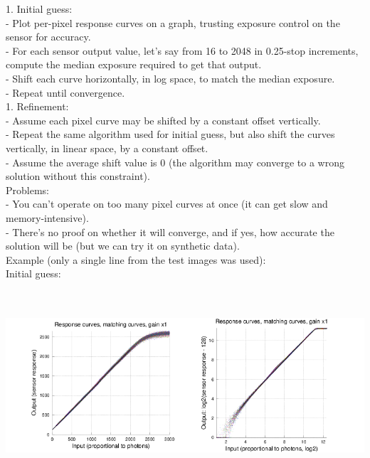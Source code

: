 1. Initial guess:\\

- Plot per-pixel response curves on a graph, trusting exposure control on the sensor for accuracy.\\
- For each sensor output value, let's say from 16 to 2048 in 0.25-stop increments, compute the median exposure required to get that output.\\
- Shift each curve horizontally, in log space, to match the median exposure.\\
- Repeat until convergence.\\
 
1. Refinement:\\

- Assume each pixel curve may be shifted by a constant offset vertically.\\
- Repeat the same algorithm used for initial guess, but also shift the curves vertically, in linear space, by a constant offset.\\
- Assume the average shift value is 0 (the algorithm may converge to a wrong solution without this constraint).\\

Problems:\\

- You can't operate on too many pixel curves at once (it can get slow and memory-intensive).\\
- There's no proof on whether it will converge, and if yes, how accurate the solution will be (but we can try it on synthetic data).\\ 

Example (only a single line from the test images was used): \\

Initial guess:\\

\begin{center}
\includegraphics[height=7cm]{images/response-curve-test-init}
\end{center}

